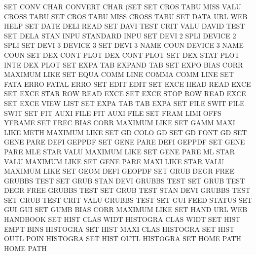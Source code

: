 SET      CONV CHAR                      CONVERT  CHAR (SET
SET      CROS TABU MISS VALU            CROSS    TABU
SET      CROS TABU MISS                 CROSS    TABU
SET      DATA URL                       WEB      HELP
SET      DATE DELI                      READ
SET      DAVI TEST CRIT VALU            DAVID    TEST
SET      DELA STAN INPU                 STANDARD INPU
SET      DEVI 2    SPLI                 DEVICE   2    SPLI 
SET      DEVI 3                         DEVICE   3
SET      DEVI 3    NAME COUN            DEVICE   3    NAME COUN
SET      DEX  CONT PLOT                 DEX      CONT PLOT
SET      DEX  STAT PLOT INTE            DEX      PLOT
SET      EXPA TAB                       EXPAND   TAB
SET      EXPO BIAS CORR                 MAXIMUM  LIKE
SET      EQUA COMM LINE                 COMMA    COMM LINE
SET      FATA ERRO                      FATAL    ERRO
SET      EDIT                           EDIT
SET      EXCE HEAD                      READ     EXCE
SET      EXCE STAR ROW                  READ     EXCE
SET      EXCE STOP ROW                  READ     EXCE
SET      EXCE VIEW                      LIST
SET      EXPA TAB                       TAB      EXPA
SET      FILE SWIT                      FILE     SWIT
SET      FIT  AUXI FILE                 FIT      AUXI FILE
SET      FRAM LIMI OFFS                 YFRAME
SET      FREC BIAS CORR                 MAXIMUM  LIKE
SET      GAMM MAXI LIKE METH            MAXIMUM  LIKE
SET      GD   COLO                      GD
SET      GD   FONT                      GD
SET      GENE PARE DEFI                 GEPPDF
SET      GENE PARE DEFI                 GEPPDF
SET      GENE PARE MLE  STAR VALU       MAXIMUM  LIKE
SET      GENE PARE ML   STAR VALU       MAXIMUM  LIKE
SET      GENE PARE MAXI LIKE STAR VALU  MAXIMUM  LIKE
SET      GEOM DEFI                      GEOPDF
SET      GRUB DEGR FREE                 GRUBBS   TEST
SET      GRUB STAN DEVI                 GRUBBS   TEST
SET      GRUB TEST DEGR FREE            GRUBBS   TEST
SET      GRUB TEST STAN DEVI            GRUBBS   TEST
SET      GRUB TEST CRIT VALU            GRUBBS   TEST
SET      GUI  FEED                      STATUS
SET      GUI                            GUI
SET      GUMB BIAS CORR                 MAXIMUM  LIKE
SET      HAND URL                       WEB      HANDBOOK
SET      HIST CLAS WIDT                 HISTOGRA CLAS WIDT
SET      HIST EMPT BINS                 HISTOGRA
SET      HIST MAXI CLAS                 HISTOGRA
SET      HIST OUTL POIN                 HISTOGRA
SET      HIST OUTL                      HISTOGRA
SET      HOME PATH                      HOME     PATH
